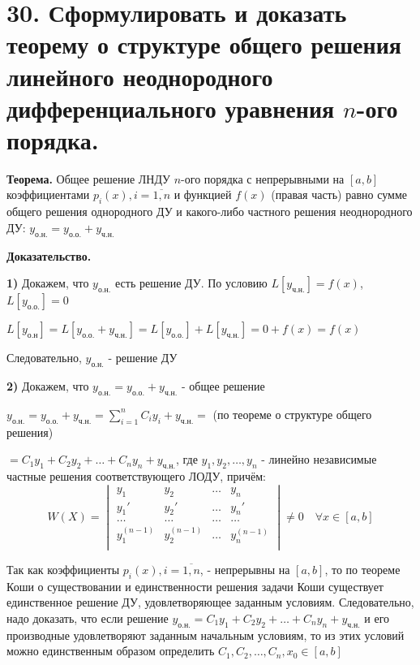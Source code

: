 \documentclass[11pt]{article}
\begin{document}
\section*{30. Сформулировать и доказать теорему о структуре общего решения линейного неоднородного дифференциального уравнения $n$-ого порядка.}
\par\textbf{Теорема.} Общее решение ЛНДУ $n$-ого порядка с непрерывными на $[a, b]$ коэффициентами $p_{i}(x), i = \overline{1, n}$ и функцией $f(x)$ (правая часть) равно сумме общего решения однородного ДУ и какого-либо частного решения неоднородного ДУ: $y_{\text{о.н.}} = y_{\text{о.о.}} + y_{\text{ч.н.}}$
\par\textbf{Доказательство.}
\par\textbf{1)} Докажем, что $y_{\text{о.н.}}$ есть решение ДУ. По условию $L[y_{\text{ч.н.}}] = f(x)$, $L[y_{\text{о.о.}}] = 0$
\par $L[y_{\text{о.н}}] = L[y_{\text{о.о.}} + y_{\text{ч.н.}}] = L[y_{\text{о.о.}}] + L[y_{\text{ч.н.}}] = 0 + f(x) = f(x)$
\par Следовательно, $y_{\text{о.н.}}$ - решение ДУ
\par\textbf{2)} Докажем, что $y_{\text{о.н.}} = y_{\text{о.о.}} + y_{\text{ч.н.}}$ - общее решение
\par $y_{\text{о.н.}} = y_{\text{о.о.}} + y_{\text{ч.н.}} = \sum_{i=1}^n C_{i} y_{i} + y_{\text{ч.н.}} =$ (по теореме о структуре общего решения)
\par $= C_{1}y_{1} + C_{2}y_{2} + \dots + C_{n} y_{n} + y_{\text{ч.н.}}$, где $y_{1}, y_{2}, \dots, y_{n}$ - линейно независимые частные решения соответствующего ЛОДУ, причём:
$$W(X) = \begin{vmatrix}{}
y_{1} & y_{2} & \dots & y_{n} \\
y_{1}' & y_{2}' & \dots & y_{n}' \\
\dots & \dots & \dots & \dots \\
y_{1}^{(n-1)} & y_{2}^{(n-1)} & \dots & y_{n}^{(n-1)} \\
\end{vmatrix} \neq 0 \quad \forall x \in [a, b]$$
\par Так как коэффициенты $p_i(x), i = \overline{1, n}$, - непрерывны на $[a, b]$, то по теореме Коши о существовании и единственности решения задачи Коши существует единственное решение ДУ, удовлетворяющее заданным условиям. Следовательно, надо доказать, что если решение $y_{\text{о.н.}} = C_{1}y_{1} + C_{2}y_{2} + \dots + C_{n} y_{n} + y_{\text{ч.н.}}$ и его производные удовлетворяют заданным начальным условиям, то из этих условий можно единственным образом определить $C_{1}, C_{2}, \dots, C_{n}, x_{0} \in [a, b]$
\end{document}
